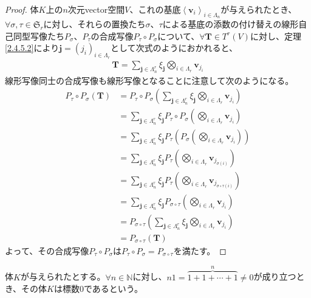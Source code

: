 \documentclass[dvipdfmx]{jsarticle}
\begin{document}
\begin{proof}
体$K$上の$n$次元vector空間$V$、これの基底$\left\langle \mathbf{v}_{i} \right\rangle_{i \in \varLambda_{n}}$が与えられたとき、$\forall\sigma,\tau \in \mathfrak{S}_{r}$に対し、それらの置換たち$\sigma$、$\tau$による基底の添数の付け替えの線形自己同型写像たち$P_{\sigma}$、$P_{\tau}$の合成写像$P_{\tau} \circ P_{\sigma}$について、$\forall\mathbf{T} \in T^{r}(V)$に対し、定理\ref{2.4.5.2}により$\mathbf{j}=\left( j_{i} \right)_{i \in \varLambda_{r}}$として次式のようにおかれると、
\begin{align*}
\mathbf{T} = \sum_{\mathbf{j} \in \varLambda_{n}^{r}} {\xi_{\mathbf{j}}\bigotimes_{i \in \varLambda_{r}} \mathbf{v}_{j_{i}}}
\end{align*}
線形写像同士の合成写像も線形写像となることに注意して次のようになる。
\begin{align*}
P_{\tau} \circ P_{\sigma}\left( \mathbf{T} \right) &= P_{\tau} \circ P_{\sigma}\left( \sum_{\mathbf{j} \in \varLambda_{n}^{r}} {\xi_{\mathbf{j}}\bigotimes_{i \in \varLambda_{r}} \mathbf{v}_{j_{i}}} \right)\\
&= \sum_{\mathbf{j} \in \varLambda_{n}^{r}} {\xi_{\mathbf{j}}P_{\tau} \circ P_{\sigma}\left( \bigotimes_{i \in \varLambda_{r}} \mathbf{v}_{j_{i}} \right)}\\
&= \sum_{\mathbf{j} \in \varLambda_{n}^{r}} {\xi_{\mathbf{j}}P_{\tau}\left( P_{\sigma}\left( \bigotimes_{i \in \varLambda_{r}} \mathbf{v}_{j_{i}} \right) \right)}\\
&= \sum_{\mathbf{j} \in \varLambda_{n}^{r}} {\xi_{\mathbf{j}}P_{\tau}\left( \bigotimes_{i \in \varLambda_{r}} \mathbf{v}_{j_{\sigma(i)}} \right)}\\
&= \sum_{\mathbf{j} \in \varLambda_{n}^{r}} {\xi_{\mathbf{j}}P_{\tau}\left( \bigotimes_{i \in \varLambda_{r}} \mathbf{v}_{j_{\sigma \circ \tau(i)}} \right)}\\
&= \sum_{\mathbf{j} \in \varLambda_{n}^{r}} {\xi_{\mathbf{j}}P_{\sigma \circ \tau}\left( \bigotimes_{i \in \varLambda_{r}} \mathbf{v}_{j_{i}} \right)}\\
&= P_{\sigma \circ \tau}\left( \sum_{\mathbf{j} \in \varLambda_{n}^{r}} {\xi_{\mathbf{j}}\bigotimes_{i \in \varLambda_{r}} \mathbf{v}_{j_{i}}} \right)\\
&= P_{\sigma \circ \tau}\left( \mathbf{T} \right)
\end{align*}
よって、その合成写像$P_{\tau} \circ P_{\sigma}$は$P_{\tau} \circ P_{\sigma} = P_{\sigma \circ \tau}$を満たす。
\end{proof}
\begin{dfn}
体$K$が与えられたとする。$\forall n \in \mathbb{N}$に対し、$n1 = \overset{n}{\overbrace{1 + 1 + \cdots + 1}} \neq 0$が成り立つとき、その体$K$は標数$0$であるという。
\end{dfn}
\end{document}
